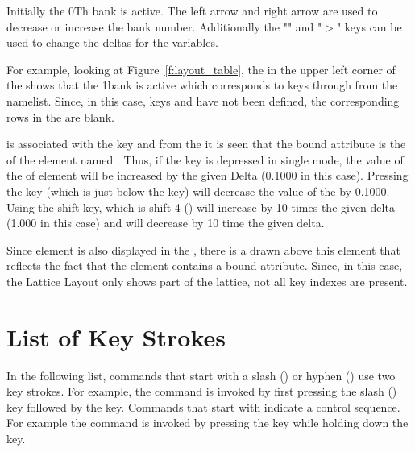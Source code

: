 Initially the 0Th bank is active. The left arrow and right arrow are
used to decrease or increase the bank number.  Additionally the
"\vn{<}" and "$>$" keys can be used to change the deltas for the
variables.

For example, looking at Figure~\ref{f:layout_table}, the  in the upper
left corner of the  shows that the 1\St bank is active which 
corresponds to keys  through  from the  namelist.
Since, in this case, keys  and  have not been defined, the 
corresponding rows in the  are blank.

 is associated with the  key and from the  it is
seen that the bound attribute is the  of the element named .
Thus, if the  key is depressed in single mode, the value of the 
of element  will be increased by the given Delta (0.1000 in this case). Pressing
the  key (which is just below the  key) will decrease the value of the
 by 0.1000. Using the shift key, which is shift-4 () will 
increase  by 10 times the given delta (1.000 in this case) and 
 will decrease by 10 time the given delta.

Since element  is also displayed in the , there is a 
drawn above this element that reflects the fact that the element 
contains a bound attribute. Since, in this case, the Lattice Layout only shows part
of the lattice, not all key indexes are present.


\section{List of Key Strokes}
\label{s:keys}

In the following list, commands that start with a slash (\vn{/}) or
hyphen (\vn{-}) use two key strokes. For example, the  command
is invoked by first pressing the slash (\vn{/}) key followed by the
 key. Commands that start with \vn{\W} indicate a control
sequence. For example the  command is invoked by pressing
the  key while holding down the  key.


